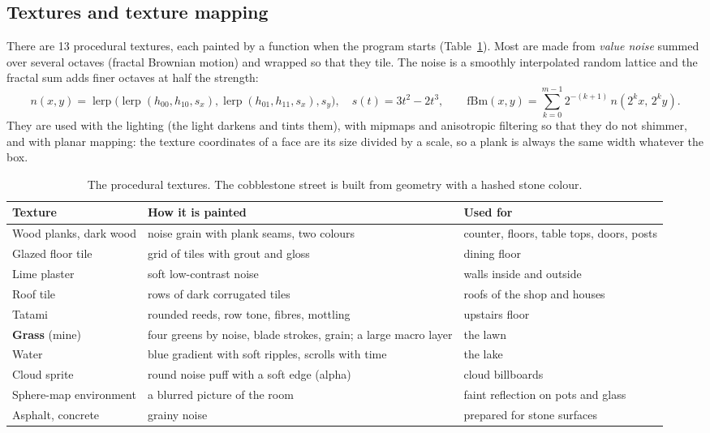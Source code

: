 \documentclass[10pt,a4paper]{article}
\begin{document}
\subsection{Textures and texture mapping}\label{sec:tex}
There are 13 procedural textures, each painted by a function when the program starts (Table~\ref{tab:tex}). Most are made from \emph{value noise} summed over several octaves (fractal Brownian motion) and wrapped so that they tile. The noise is a smoothly interpolated random lattice and the fractal sum adds finer octaves at half the strength:
\begin{equation}
n(x,y)=\operatorname{lerp}\big(\operatorname{lerp}(h_{00},h_{10},s_x),\operatorname{lerp}(h_{01},h_{11},s_x),s_y\big),\quad s(t)=3t^2-2t^3,\qquad
\mathrm{fBm}(x,y)=\sum_{k=0}^{m-1}2^{-(k+1)}\,n(2^kx,\,2^ky).
\end{equation}
They are used with the lighting (the light darkens and tints them), with mipmaps and anisotropic filtering so that they do not shimmer, and with planar mapping: the texture coordinates of a face are its size divided by a scale, so a plank is always the same width whatever the box.
\begin{table}[htbp]
\centering\small
\begin{tabular}{@{}p{3.2cm}p{7.2cm}p{5.5cm}@{}}
\toprule
\textbf{Texture} & \textbf{How it is painted} & \textbf{Used for}\\
\midrule
Wood planks, dark wood & noise grain with plank seams, two colours & counter, floors, table tops, doors, posts\\
Glazed floor tile & grid of tiles with grout and gloss & dining floor\\
Lime plaster & soft low-contrast noise & walls inside and outside\\
Roof tile & rows of dark corrugated tiles & roofs of the shop and houses\\
Tatami & rounded reeds, row tone, fibres, mottling & upstairs floor\\
\textbf{Grass} (mine) & four greens by noise, blade strokes, grain; a large macro layer & the lawn\\
Water & blue gradient with soft ripples, scrolls with time & the lake\\
Cloud sprite & round noise puff with a soft edge (alpha) & cloud billboards\\
Sphere-map environment & a blurred picture of the room & faint reflection on pots and glass\\
Asphalt, concrete & grainy noise & prepared for stone surfaces\\
\bottomrule
\end{tabular}
\caption{The procedural textures. The cobblestone street is built from geometry with a hashed stone colour.}\label{tab:tex}
\end{table}
\end{document}
